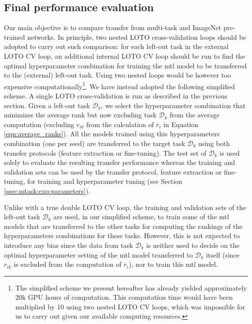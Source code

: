 \subsection{Final performance evaluation}
\label{ssec:mtask:exp:model_eval}

Our main objective is to compare transfer from multi-task and ImageNet pre-trained networks. In principle, two nested LOTO cross-validation loops should be adopted to carry out such comparison:  for each left-out task in the external LOTO CV loop, an additional internal LOTO CV loop should be run to find the optimal hyperparameter combination for training the \acrshort{mtl} model to be transferred to the (external) left-out task. Using two nested loops would be however too expensive computationally\footnote{The simplified scheme we present hereafter has already yielded approximately 20k GPU hours of computation. This computation time would have been multiplied by 10 using two nested LOTO CV loops, which was impossible for us to carry out given our available computing resources.}. We have instead adopted the following simplified scheme. A single LOTO cross-validation is run as described in the previous section. Given a left-out task $\mathcal{D}_k$, we select the hyperparameter combination that minimizes the average rank but now excluding task $\mathcal{D}_k$ from the average computation (\ie excluding $r_{ik}$ from the calculation of $\overline{r}_i$ in Equation \ref{eqn:average_ranks}). All the models trained using this hyperparameters combination (\ie one per seed) are transferred to the target task $\mathcal{D}_k$ using both transfer protocols (\ie feature extraction or fine-tuning). The test set of $\mathcal{D}_k$ is used solely to evaluate the resulting transfer performance whereas the training and validation sets can be used by the transfer protocol, feature extraction or fine-tuning, for training and hyperparameter tuning (see Section \ref{ssec:mtask:exp:parameters}).

Unlike with a true double LOTO CV loop, the training and validation sets of the left-out task $\mathcal{D}_k$ are used, in our simplified scheme, to train some of the \acrshort{mtl} models that are transferred to the other tasks for computing the rankings of the hyperparameters combinations for these tasks. However, this is not expected to introduce any bias since the data from task $\mathcal{D}_k$ is neither used to decide on the optimal hyperparameter setting of the \acrshort{mtl} model transferred to $\mathcal{D}_k$ itself (since $r_{ik}$ is excluded from the computation of $\overline{r}_i$), nor to train this \acrshort{mtl} model.

